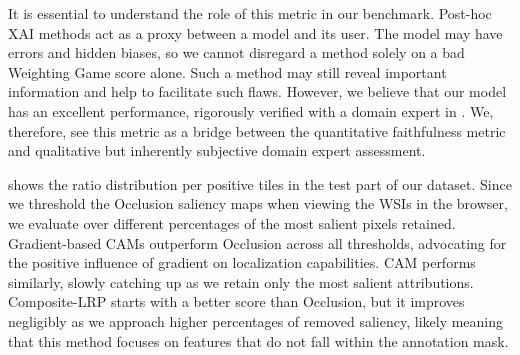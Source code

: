 It is essential to understand the role of this metric in our benchmark.
Post-hoc XAI methods act as a proxy between a model and its user.
The model may have errors and hidden biases, so we cannot disregard a method solely on a bad Weighting Game score alone.
Such a method may still reveal important information and help to facilitate such flaws.
However, we believe that our model has an excellent performance, rigorously verified with a domain expert in \cite{gallo}.
We, therefore, see this metric as a bridge between the quantitative faithfulness metric and qualitative but inherently subjective domain expert assessment.

 shows the ratio distribution per positive tiles in the test part of our dataset.
Since we threshold the Occlusion saliency maps when viewing the WSIs in the browser, we evaluate over different percentages of the most salient pixels retained.
Gradient-based CAMs outperform Occlusion across all thresholds, advocating for the positive influence of gradient on localization capabilities.
CAM performs similarly, slowly catching up as we retain only the most salient attributions.
Composite-LRP starts with a better score than Occlusion, but it improves negligibly as we approach higher percentages of removed saliency, likely meaning that this method focuses on features that do not fall within the annotation mask.


